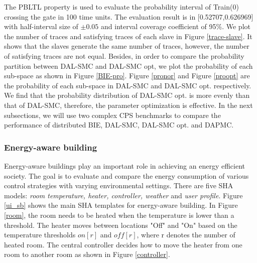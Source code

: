 The PBLTL property is used to evaluate the probability interval of Train(0) crossing the gate in 100 time units. The evaluation result is in [0.52707,0.626969] with half-interval size of $\pm0.05$ and interval coverage coefficient of 95\%. We plot the number of traces and satisfying traces of each slave in Figure \ref{trace-slave}. It shows that the slaves generate the same number of traces, however, the number of satisfying traces are not equal. Besides, in order to compare the probability partition between DAL-SMC and DAL-SMC opt, we plot the probability of each sub-space as shown in Figure \ref{BIE-pro}. Figure \ref{pronor} and Figure \ref{proopt} are the probability of each sub-space in DAL-SMC and DAL-SMC opt. respectively. We find that the probability distribution of DAL-SMC opt. is more evenly than that of DAL-SMC, therefore, the parameter optimization is effective. In the next subsections, we will use two complex CPS benchmarks to compare the performance of distributed BIE, DAL-SMC, DAL-SMC opt. and DAPMC.
\begin{figure}[htbp]
\end{figure}

\subsubsection{Energy-aware building}
Energy-aware buildings play an important role in achieving an energy efficient society. The goal is to evaluate and compare the energy consumption of various control strategies with varying environmental settings. There are five SHA models: \emph{room temperature, heater, controller, weather} and \emph{user profile}. Figure \ref{ui_sb} shows the main SHA templates for energy-aware building. In Figure \ref{room}, the room needs to be heated when the temperature is lower than a threshold. The heater moves between locations "Off" and "On" based on the temperature thresholds $on[r]$ and $off[r]$, where r denotes the number of heated room. The central controller decides how to move the heater from one room to another room as shown in Figure \ref{controller}.

